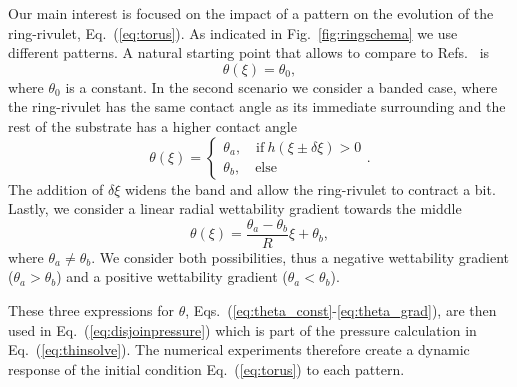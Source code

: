 \documentclass[twoside,twocolumn,9pt]{article}
\begin{document}
Our main interest is focused on the impact of a pattern on the evolution of the ring-rivulet, Eq.~(\ref{eq:torus}). 
As indicated in Fig.~\ref{fig:ringschema} we use different patterns.
A natural starting point that allows to compare to Refs.~\cite{gonzalezStabilityLiquidRing2013, nguyenCompetitionCollapseBreakup2012, wuBreakupPatternedNanoscale2010} is
\begin{equation}\label{eq:theta_const}
    \theta(\xi) = \theta_0,
\end{equation}
where $\theta_0$ is a constant.
In the second scenario we consider a banded case, where the ring-rivulet has the same contact angle as its immediate surrounding and the rest of the substrate has a higher contact angle
\begin{equation}\label{eq:theta_band}
    \theta(\xi) =\begin{cases}
        \theta_a,\quad \text{if}~h(\xi\pm \delta\xi) > 0\\
        \theta_b,\quad \text{else}
    \end{cases}.
\end{equation}
The addition of $\delta\xi$ widens the band and allow the ring-rivulet to contract a bit.  
Lastly, we consider a linear radial wettability gradient towards the middle
\begin{equation}\label{eq:theta_grad}
    \theta(\xi) = \frac{\theta_{a}-\theta_{b}}{R} \xi + \theta_{b},
\end{equation}
where $\theta_{a}\neq\theta_{b}$.
We consider both possibilities, thus a negative wettability gradient ($\theta_a > \theta_b$) and a positive wettability gradient ($\theta_a < \theta_b$).

These three expressions for $\theta$, Eqs.~(\ref{eq:theta_const}-\ref{eq:theta_grad}), are then used in Eq.~(\ref{eq:disjoinpressure}) which is part of the pressure calculation in Eq.~(\ref{eq:thinsolve}).
The numerical experiments therefore create a dynamic response of the initial condition Eq.~(\ref{eq:torus}) to each pattern.
\end{document}
